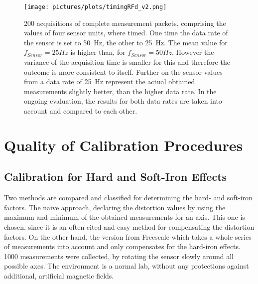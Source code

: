 \begin{figure}[!htb]
\centering
\texttt{[image: pictures/plots/timingRFd\_v2.png]}
\caption{200 acquisitions of complete measurement packets, comprising the values of four sensor units, where timed. One time the data rate of the sensor is set to \SI{50}{\Hz}, the other to \SI{25}{\Hz}. The mean value for $ f_{Sensor}=25\si{Hz} $ is higher than, for $ f_{Sensor}=50\si{Hz} $. However the variance of the acquisition time is smaller for this and therefore the outcome is more consistent to itself. Further on the sensor values from a data rate of \SI{25}{\Hz} represent the actual obtained measurements slightly better, than the higher data rate. In the ongoing evaluation, the results for both data rates are taken into account and compared to each other. }
\label{fig:sensTime}
\end{figure}


\section{Quality of Calibration Procedures} \label{sec:cali}

\subsection{Calibration for Hard and Soft-Iron Effects}\label{subsec:resHardSoft}

Two methods are compared and classified for determining the hard- and soft-iron factors. The naive approach, declaring the distortion values by using the maximum and minimum of the obtained measurements for an axis. This one is chosen, since it is an often cited and easy method for compensating the distortion factors. On the other hand, the version from Freescale \cite{ozyagcilar2012calibrating} which takes a whole series of measurements into account and only compensates for the hard-iron effects. 1000 measurements were collected, by rotating the sensor slowly around all possible axes. The environment is a normal lab, without any protections against additional, artificial magnetic fields. 

